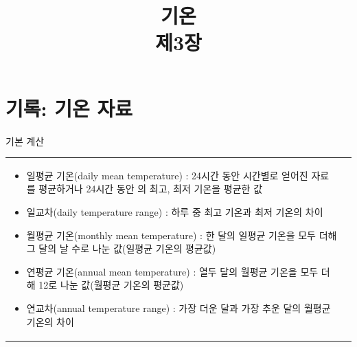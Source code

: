 \title[]{기온\\\small{제3장}}

\begin{frame}[plain] %
	\titlepage
\end{frame}


\begin{frame}[plain] %
	\ccpage
\end{frame}


\section{기록: 기온 자료}

\begin{frame}[t]{기본 계산}
	\begin{tabular}{ll}
		\begin{minipage}[t]{0.90\textwidth}
			\begin{itemize}
				\item 일평균 기온(daily mean temperature)
				: 24시간 동안 시간별로 얻어진 자료를 평균하거나 24시간 동안
				의 최고, 최저 기온을 평균한 값
				\item 일교차(daily temperature range)
				: 하루 중 최고 기온과 최저 기온의 차이
				\item 월평균 기온(monthly mean temperature)
				: 한 달의 일평균 기온을 모두 더해 그 달의 날 수로 나눈 값(일평균 기온의 평균값)
				\item 연평균 기온(annual mean temperature)
				: 열두 달의 월평균 기온을 모두 더해 12로 나눈 값(월평균 기온의 평균값)
				\item 연교차(annual temperature range)
				: 가장 더운 달과 가장 추운 달의 월평균 기온의 차이
			\end{itemize}			
		\end{minipage}
		&
	\end{tabular}
\end{frame}




